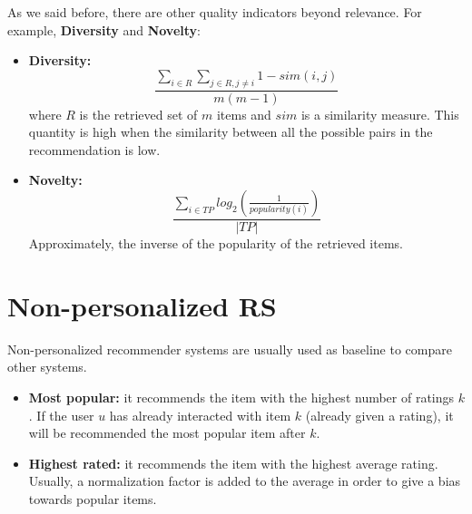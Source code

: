 As we said before, there are other quality indicators beyond relevance. For example, \textbf{Diversity} and \textbf{Novelty}:
\begin{itemize}
    \item \textbf{Diversity:}
    \[\frac{\sum_{i \in R}\sum_{j \in R,j \neq i} 1 - sim(i,j)}{m(m-1)}\]
    where $R$ is the retrieved set of $m$ items and $sim$ is a similarity measure. This quantity is high when the similarity between all the possible pairs in the recommendation is low.
    \item \textbf{Novelty:}
    \[\frac{\sum_{i \in TP}log_{2}\left(\frac{1}{popularity(i)}\right)}{|TP|}\]
    Approximately, the inverse of the popularity of the retrieved items.
\end{itemize}
\section{Non-personalized RS}
Non-personalized recommender systems are usually used as baseline to compare other systems.
\begin{itemize}
    \item \textbf{Most popular:} it recommends the item with the highest number of ratings $k$. If the user $u$ has already interacted with item $k$ (already given a rating), it will be recommended the most popular item after $k$.
    \item \textbf{Highest rated:} it recommends the item with the highest average rating. Usually, a normalization factor is added to the average in order to give a bias towards popular items.
\end{itemize}
